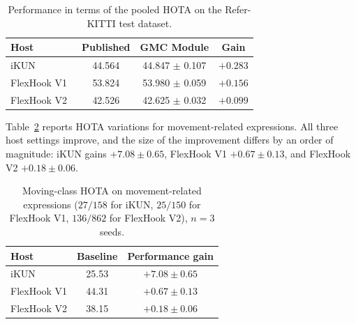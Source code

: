 \documentclass{article}
\begin{document}

\begin{table}
  \centering
  \caption{Performance in terms of the pooled HOTA on the Refer-KITTI test dataset.}
  \label{tab:main}
  \small
  \setlength{\tabcolsep}{2pt}
  \begin{tabular}{lccc}
    \hline
    Host                        & Published & GMC Module           & Gain                      \\
    \hline
    iKUN~\cite{ikun}            & 44.564    & 44.847 $\pm$ 0.107 & $+0.283$ \\
    FlexHook V1~\cite{flexhook} & 53.824    & 53.980 $\pm$ 0.059 & $+0.156$ \\
    FlexHook V2~\cite{flexhook} & 42.526    & 42.625 $\pm$ 0.032 & $+0.099$ \\
    \hline
  \end{tabular}
\end{table}


Table~\ref{tab:deficit} reports HOTA variations for movement-related expressions. All three host settings improve, and the size of the improvement differs by an order of magnitude: iKUN gains $+7.08\pm0.65$, FlexHook V1 $+0.67\pm0.13$, and FlexHook V2 $+0.18\pm0.06$.



\begin{table}
  \centering
  \caption{Moving-class HOTA on movement-related expressions ($27/158$ for iKUN, $25/150$ for FlexHook V1, $136/862$ for FlexHook V2), $n{=}3$ seeds.}
  \label{tab:deficit}
  \small
  \setlength{\tabcolsep}{2pt}
  \begin{tabular}{lcc}
    \hline
    Host        & Baseline & Performance gain \\
    \hline
    iKUN        & 25.53    & $+7.08\pm0.65$   \\
    FlexHook V1 & 44.31    & $+0.67\pm0.13$   \\
    FlexHook V2 & 38.15    & $+0.18\pm0.06$   \\
    \hline
  \end{tabular}
\end{table}
\end{document}
